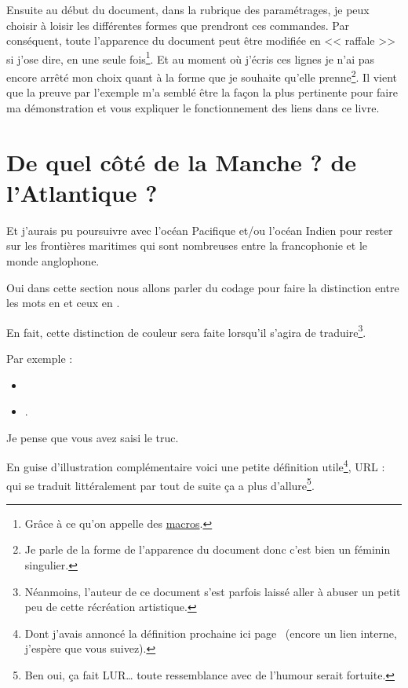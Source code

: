 Ensuite au début du document, dans la rubrique des paramétrages, je
peux choisir à loisir les différentes formes que prendront ces
commandes. Par conséquent, toute l'apparence du document peut être
modifiée en << raffale >> si j'ose dire, en une seule
fois\footnote{Grâce à ce qu'on appelle des \href{http://www.tuteurs.ens.fr/logiciels/latex/macros.html}{macros}.}. Et au
moment où j'écris ces lignes je n'ai pas encore arrêté mon choix quant
à la forme que je souhaite qu'elle prenne\footnote{Je parle de la
  forme de l'apparence du document donc c'est bien un féminin
  singulier.}. Il vient que la preuve par l'exemple m'a semblé être la
façon la plus pertinente pour faire ma démonstration et vous expliquer le fonctionnement des liens dans ce livre.

\newpage

\section{De quel côté de la Manche ? de l'Atlantique ?}\label{sec:side}

Et j'aurais pu poursuivre avec l'océan Pacifique et/ou l'océan Indien
pour rester sur les frontières maritimes qui sont nombreuses entre la
francophonie et le monde anglophone.

Oui dans cette section nous allons parler du codage pour faire la
distinction entre les mots en  et ceux en .

En fait, cette distinction de couleur sera faite lorsqu'il s'agira de
traduire\footnote{Néanmoins, l'auteur de ce document s'est parfois 
  laissé aller à abuser un petit peu de cette récréation artistique.}.

Par exemple :
\begin{itemize}
\item {}
\item {}.  
\end{itemize}

Je pense que vous avez saisi le truc.

En guise d'illustration complémentaire voici une petite définition
utile\footnote{Dont j'avais annoncé la définition prochaine ici
  page~\pageref{sec:link} (encore un lien interne, j'espère que vous
  suivez).}, URL :  qui se traduit
littéralement par  tout de
suite ça a plus d'allure\footnote{Ben oui, ça fait LUR\dots\xspace toute
  ressemblance avec de l'humour serait fortuite.}.

